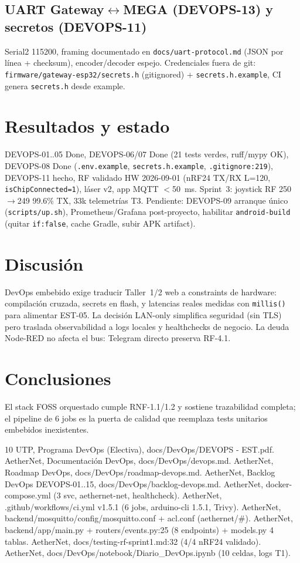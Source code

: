 \documentclass[conference]{IEEEtran}
\begin{document}
\subsection{UART Gateway$\leftrightarrow$MEGA (DEVOPS-13) y secretos (DEVOPS-11)}
Serial2 115200, framing documentado en \texttt{docs/uart-protocol.md} (JSON por línea + checksum), encoder/decoder espejo. Credenciales fuera de git: \texttt{firmware/gateway-esp32/secrets.h} (gitignored) + \texttt{secrets.h.example}, CI genera \texttt{secrets.h} desde example.

\section{Resultados y estado}
DEVOPS-01..05 Done, DEVOPS-06/07 Done (21 tests verdes, ruff/mypy OK), DEVOPS-08 Done (\texttt{.env.example}, \texttt{secrets.h.example}, \texttt{.gitignore:219}), DEVOPS-11 hecho, RF validado HW 2026-09-01 (nRF24 TX/RX L=120, \texttt{isChipConnected=1}), láser v2, app MQTT $<$50~ms. Sprint~3: joystick RF 250$\rightarrow$249 99.6\% TX, 33k telemetrías T3. Pendiente: DEVOPS-09 arranque único (\texttt{scripts/up.sh}), Prometheus/Grafana post-proyecto, habilitar \texttt{android-build} (quitar \texttt{if:false}, cache Gradle, subir APK artifact).

\section{Discusión}
DevOps embebido exige traducir Taller~1/2 web a constraints de hardware: compilación cruzada, secrets en flash, y latencias reales medidas con \texttt{millis()} para alimentar EST-05. La decisión LAN-only simplifica seguridad (sin TLS) pero traslada observabilidad a logs locales y healthchecks de negocio. La deuda Node-RED no afecta el bus: Telegram directo preserva RF-4.1.

\section{Conclusiones}
El stack FOSS orquestado cumple RNF-1.1/1.2 y sostiene trazabilidad completa; el pipeline de 6 jobs es la puerta de calidad que reemplaza tests unitarios embebidos inexistentes.

\begin{thebibliography}{10}
 UTP, Programa DevOps (Electiva), docs/DevOps/DEVOPS - EST.pdf.
 AetherNet, Documentación DevOps, docs/DevOps/devops.md.
 AetherNet, Roadmap DevOps, docs/DevOps/roadmap-devops.md.
 AetherNet, Backlog DevOps DEVOPS-01..15, docs/DevOps/backlog-devops.md.
 AetherNet, docker-compose.yml (3 svc, aethernet-net, healthcheck).
 AetherNet, .github/workflows/ci.yml v1.5.1 (6 jobs, arduino-cli 1.5.1, Trivy).
 AetherNet, backend/mosquitto/config/mosquitto.conf + acl.conf (aethernet/\#).
 AetherNet, backend/app/main.py + routers/events.py:25 (8 endpoints) + models.py 4 tablas.
 AetherNet, docs/testing-rf-sprint1.md:32 (4/4 nRF24 validado).
 AetherNet, docs/DevOps/notebook/Diario\_DevOps.ipynb (10 celdas, logs T1).
\end{thebibliography}
\end{document}
